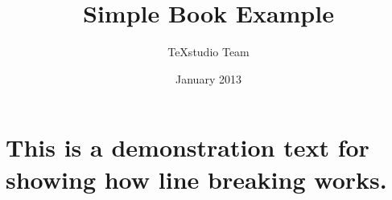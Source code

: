 \documentclass[a4paper,12pt]{book}
\begin{document}
\author{TeXstudio Team}
\title{Simple Book Example}
\date{January 2013}


\mainmatter
\chapter[Short title]{This is a demonstration text for showing how line breaking works.}
\lipsum

\backmatter
\end{document}
